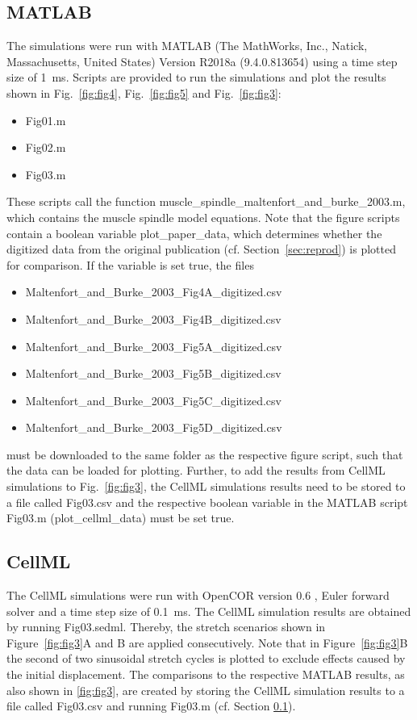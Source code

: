 \documentclass[fleqn,10pt]{physiome}
\begin{document}
\subsection{MATLAB}\label{sec:run_matlab}
The simulations were run with MATLAB (The
MathWorks, Inc., Natick, Massachusetts, United States) Version R2018a (9.4.0.813654) using a time step size of \SI{1}{\milli\second}. 
Scripts are provided to run the simulations and plot the results shown in Fig.~\ref{fig:fig4}, Fig.~\ref{fig:fig5} and Fig.~\ref{fig:fig3}:
\begin{itemize}
    \item[]Fig01.m
    \item[]Fig02.m
    \item[]Fig03.m
\end{itemize}
These scripts call the function {muscle\_spindle\_maltenfort\_and\_burke\_2003.m}, which contains the muscle spindle model equations. 
Note that the figure scripts contain a boolean variable plot\_paper\_data, which determines whether the digitized data from the original publication (cf. Section~\ref{sec:reprod}) is plotted for comparison. If the variable is set true, the files 
\begin{itemize}
    \item[] Maltenfort\_and\_Burke\_2003\_Fig4A\_digitized.csv
    \item[] Maltenfort\_and\_Burke\_2003\_Fig4B\_digitized.csv
    \item[] Maltenfort\_and\_Burke\_2003\_Fig5A\_digitized.csv
    \item[] Maltenfort\_and\_Burke\_2003\_Fig5B\_digitized.csv
    \item[] Maltenfort\_and\_Burke\_2003\_Fig5C\_digitized.csv
    \item[] Maltenfort\_and\_Burke\_2003\_Fig5D\_digitized.csv
\end{itemize}
must be downloaded to the same folder as the respective figure script, such that the data can be loaded for plotting. 
Further, to add the results from CellML simulations to Fig.~\ref{fig:fig3}, the CellML simulations results need to be stored to a file called Fig03.csv and the respective boolean variable in the MATLAB script Fig03.m (plot\_cellml\_data) must be set true.  

\subsection{CellML}
The CellML simulations were run with OpenCOR version 0.6 \citep{opencor}, Euler forward solver and a time step size of \SI{0.1}{\milli\second}.
The CellML simulation results are obtained by running Fig03.sedml. 
Thereby, the stretch scenarios shown in Figure~\ref{fig:fig3}A and B are applied consecutively.
Note that in  Figure~\ref{fig:fig3}B the second of two sinusoidal stretch cycles is plotted to exclude effects caused by the initial displacement. 
The comparisons to the respective MATLAB results, as also shown in \autoref{fig:fig3}, are created by storing the CellML simulation results to a file called Fig03.csv and running Fig03.m (cf. Section \ref{sec:run_matlab}). 
\end{document}

